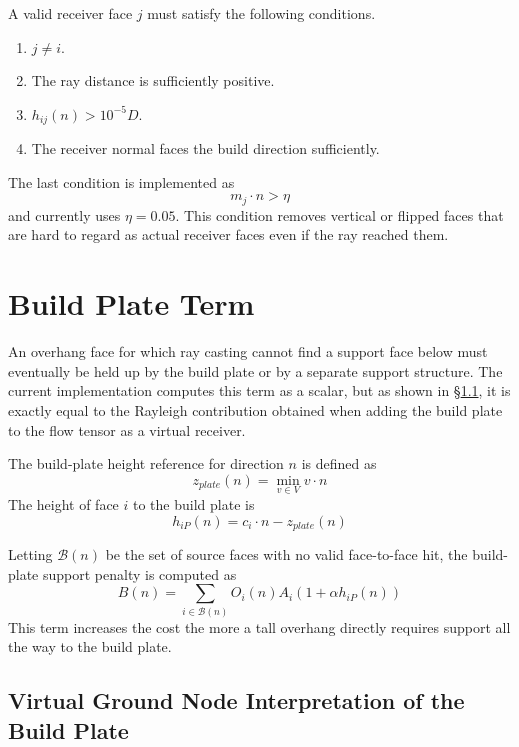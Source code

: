 \documentclass[11pt,a4paper]{article}
\begin{document}
A valid receiver face $j$ must satisfy the following conditions.

\begin{enumerate}
\item $j\ne i$.
\item The ray distance is sufficiently positive.
\item $h_{ij}(n)>10^{-5}D$.
\item The receiver normal faces the build direction sufficiently.
\end{enumerate}

The last condition is implemented as
\begin{equation}
m_j\cdot n > \eta
\end{equation}
and currently uses $\eta=0.05$.
This condition removes vertical or flipped faces that are hard to regard as actual receiver faces even if the ray reached them.

\section{Build Plate Term}

An overhang face for which ray casting cannot find a support face below must eventually be held up by the build plate or by a separate support structure.
The current implementation computes this term as a scalar, but
as shown in \S\ref{sec:groundnode}, it is exactly equal to the Rayleigh contribution obtained when adding the build plate to the flow tensor as a virtual receiver.

The build-plate height reference for direction $n$ is defined as
\begin{equation}
z_{plate}(n)=\min_{v\in V} v\cdot n
\end{equation}
The height of face $i$ to the build plate is
\begin{equation}
h_{iP}(n)=c_i\cdot n-z_{plate}(n)
\end{equation}

Letting $\mathcal{B}(n)$ be the set of source faces with no valid face-to-face hit,
the build-plate support penalty is computed as
\begin{equation}
B(n)
=
\sum_{i\in\mathcal{B}(n)}
O_i(n)A_i\left(1+\alpha h_{iP}(n)\right)
\end{equation}
This term increases the cost the more a tall overhang directly requires support all the way to the build plate.

\subsection{Virtual Ground Node Interpretation of the Build Plate}
\label{sec:groundnode}
\end{document}
